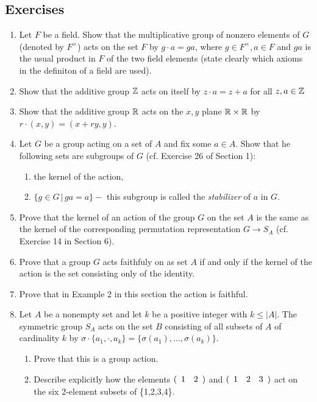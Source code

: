 \documentclass[10pt,a4paper]{report}
\begin{document}
\subsection{Exercises}

\begin{enumerate}
	\item Let $F$ be a field.  Show that the multiplicative group of nonzero elements of $G$ (denoted by $F^\times$) acts on the set $F$ by $g\cdot a=ga$, where $g \in F^\times,a \in F$ and $ga$ is the usual product in $F$ of the two field elements (state clearly which axioms in the definiton of a field are used).
	
	\item Show that the additive group $\mathbb{Z}$ acts on itself by $z\cdot a=z+a$ for all $z,a \in \mathbb{Z}$
	
	\item Show that the additive group $\mathbb{R}$ acts on the $x,y$ plane $\mathbb{R} \times \mathbb{R}$ by $r\cdot(x,y)=(x+ry,y)$.
	
	\item Let $G$ be a group acting on a set of $A$ and fix some $a \in A$.  Show that he following sets are subgroups of $G$ (cf.  Exercise 26 of Section 1):
	\begin{enumerate}
		\item the kernel of the action,
		\item $\{g \in G\,|\, ga=a\} -$ this subgroup is called the \textit{stabilizer} of $a$ in $G$.
	\end{enumerate}
	
	\item Prove that the kernel of an action of the group $G$ on the set $A$ is the same as the kernel of the corresponding permutation representation $G \to S_A$ (cf.  Exercise 14 in Section 6).
	
	\item Prove that a group $G$ acts faithfuly on as set $A$ if and only if the kernel of the action is the set consisting only of the identity.
	
	\item Prove that in Example 2 in this section the action is faithful.
	
	\item Let $A$ be a nonempty set and let $k$ be a positive integer with $k \le |A|$.  The symmetric group $S_A$ acts on the set $B$ consisting of all subsets of $A$ of cardinality $k$ by $\sigma \cdot \{a_1,\cdot,a_k\} = \{\sigma(a_1), \dots, \sigma(a_k)\}$.
	\begin{enumerate}
		\item Prove that this is a group action.
		\item Describe explicitly how the elements $(\begin{array}{cccccccccc} 1&2 \end{array})$ and $(\begin{array}{cccccccccc} 1&2&3 \end{array})$ act on the six 2-element subsets of \{1,2,3,4\}.
	\end{enumerate}
	

\end{enumerate}
\end{document}
